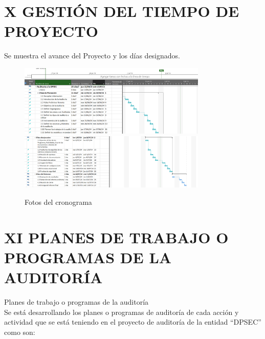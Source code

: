 \documentclass[12pt,a4paper]{article}
\begin{document}
\section{X GESTIÓN DEL TIEMPO DE PROYECTO}
Se muestra el avance del Proyecto y los días designados.
\begin{figure}[!htb]
    \centering
    \includegraphics[width=0.8\textwidth]{images/cronograma1.png}
    \includegraphics[width=0.8\textwidth]{images/cronograma2.png}
    \caption{Fotos del cronograma}
    
\end{figure}

\newpage
\section{XI PLANES DE TRABAJO O PROGRAMAS DE LA AUDITORÍA}
Planes de trabajo o programas de la auditoría\\
Se está desarrollando los planes o programas de auditoría de cada acción y actividad que
se está teniendo en el proyecto de auditoría de la entidad “DPSEC”
como son:
\end{document}
